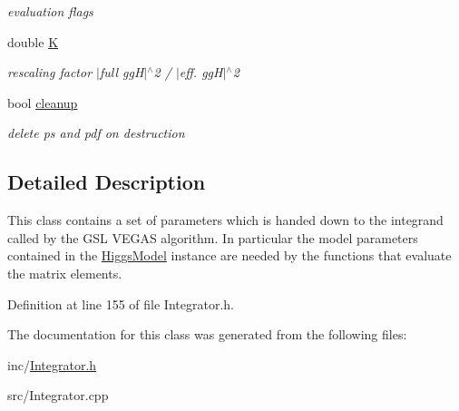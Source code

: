 \begin{DoxyCompactItemize}
\begin{DoxyCompactList}\small\item\em evaluation flags \end{DoxyCompactList}\item 
\hypertarget{classintegrand__par_afae7075055e10bd188d53fe2e1edd1e3}{double \hyperlink{classintegrand__par_afae7075055e10bd188d53fe2e1edd1e3}{K}}\label{classintegrand__par_afae7075055e10bd188d53fe2e1edd1e3}

\begin{DoxyCompactList}\small\item\em rescaling factor $\vert$full gg\-H$\vert$$^\wedge$2 / $\vert$eff. gg\-H$\vert$$^\wedge$2 \end{DoxyCompactList}\item 
\hypertarget{classintegrand__par_a1655b43b8c9e09a8bfbab014375aca49}{bool \hyperlink{classintegrand__par_a1655b43b8c9e09a8bfbab014375aca49}{cleanup}}\label{classintegrand__par_a1655b43b8c9e09a8bfbab014375aca49}

\begin{DoxyCompactList}\small\item\em delete ps and pdf on destruction \end{DoxyCompactList}\end{DoxyCompactItemize}


\subsection{Detailed Description}
This class contains a set of parameters which is handed down to the integrand called by the G\-S\-L V\-E\-G\-A\-S algorithm. In particular the model parameters contained in the \hyperlink{classHiggsModel}{Higgs\-Model} instance are needed by the functions that evaluate the matrix elements. 

Definition at line 155 of file Integrator.\-h.



The documentation for this class was generated from the following files\-:\begin{DoxyCompactItemize}
\item 
inc/\hyperlink{Integrator_8h}{Integrator.\-h}\item 
src/Integrator.\-cpp\end{DoxyCompactItemize}
